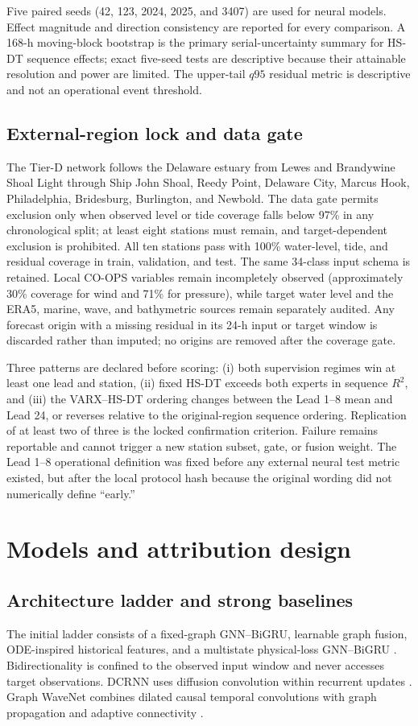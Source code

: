 \documentclass[final,5p,times,twocolumn]{elsarticle}
\begin{document}
Five paired seeds (42, 123, 2024, 2025, and 3407) are used for neural models. Effect magnitude and direction consistency are reported for every comparison. A 168-h moving-block bootstrap is the primary serial-uncertainty summary for HS-DT sequence effects; exact five-seed tests are descriptive because their attainable resolution and power are limited. The upper-tail $q95$ residual metric is descriptive and not an operational event threshold.

\subsection{External-region lock and data gate}
The Tier-D network follows the Delaware estuary from Lewes and Brandywine Shoal Light through Ship John Shoal, Reedy Point, Delaware City, Marcus Hook, Philadelphia, Bridesburg, Burlington, and Newbold. The data gate permits exclusion only when observed level or tide coverage falls below 97\% in any chronological split; at least eight stations must remain, and target-dependent exclusion is prohibited. All ten stations pass with 100\% water-level, tide, and residual coverage in train, validation, and test. The same 34-class input schema is retained. Local CO-OPS variables remain incompletely observed (approximately 30\% coverage for wind and 71\% for pressure), while target water level and the ERA5, marine, wave, and bathymetric sources remain separately audited. Any forecast origin with a missing residual in its 24-h input or target window is discarded rather than imputed; no origins are removed after the coverage gate.

Three patterns are declared before scoring: (i) both supervision regimes win at least one lead and station, (ii) fixed HS-DT exceeds both experts in sequence $R^2$, and (iii) the VARX--HS-DT ordering changes between the Lead 1--8 mean and Lead 24, or reverses relative to the original-region sequence ordering. Replication of at least two of three is the locked confirmation criterion. Failure remains reportable and cannot trigger a new station subset, gate, or fusion weight. The Lead 1--8 operational definition was fixed before any external neural test metric existed, but after the local protocol hash because the original wording did not numerically define ``early.''

\section{Models and attribution design}
\subsection{Architecture ladder and strong baselines}
The initial ladder consists of a fixed-graph GNN--BiGRU, learnable graph fusion, ODE-inspired historical features, and a multistate physical-loss GNN--BiGRU \citep{cho2014gru,schuster1997bidirectional}. Bidirectionality is confined to the observed input window and never accesses target observations. DCRNN uses diffusion convolution within recurrent updates \citep{li2018dcrnn}. Graph WaveNet combines dilated causal temporal convolutions with graph propagation and adaptive connectivity \citep{wu2019graphwavenet}.
\end{document}
